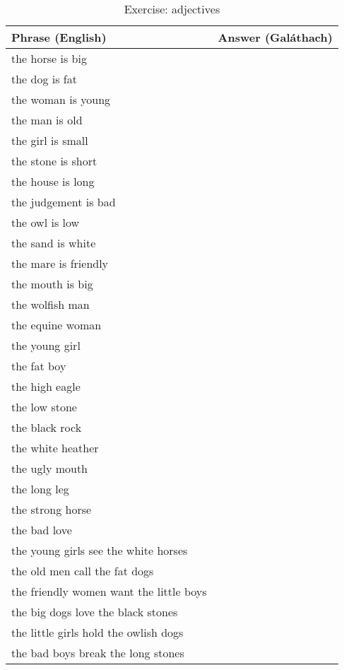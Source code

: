 \begin{table}[H]
\centering
\begin{tabular}{|l|M{10.0cm}|}
  \toprule
  \textbf{Phrase (English)} & \textbf{Answer (Gal\'{a}thach)}\\
  \toprule
  the horse is big & \\
  \midrule
  the dog is fat & \\
  \midrule
  the woman is young & \\
  \midrule
  the man is old & \\
  \midrule
  the girl is small & \\
  \midrule
  the stone is short & \\
  \midrule
  the house is long & \\
  \midrule
  the judgement is bad & \\
  \midrule
  the owl is low & \\
  \midrule
  the sand is white & \\
  \midrule
  the mare is friendly & \\
  \midrule
  the mouth is big & \\
  \midrule
  the wolfish man & \\
  \midrule
  the equine woman & \\
  \midrule
  the young girl & \\
  \midrule
  the fat boy & \\
  \midrule
  the high eagle & \\
  \midrule
  the low stone & \\
  \midrule
  the black rock & \\
  \midrule
  the white heather & \\
  \midrule
  the ugly mouth & \\
  \midrule
  the long leg & \\
  \midrule
  the strong horse & \\
  \midrule
  the bad love & \\
  \midrule
  the young girls see the white horses & \\
  \midrule
  the old men call the fat dogs & \\
  \midrule
  the friendly women want the little boys & \\
  \midrule
  the big dogs love the black stones & \\
  \midrule
  the little girls hold the owlish dogs & \\
  \midrule
  the bad boys break the long stones & \\
  \bottomrule
\end{tabular}
\label{exercise_adjectives}
\caption{Exercise: adjectives}
\end{table}

